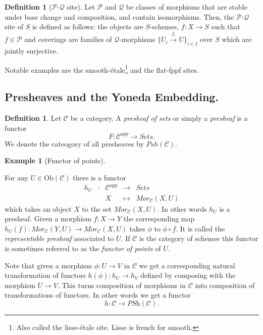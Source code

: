 \documentclass[11pt]{amsart}
\newcommand{\Ob}{\text{Ob}}
\theoremstyle{definition}
\newtheorem{definition}[theorem]{Definition}
\newtheorem{example}[theorem]{Example}
\begin{document}
\begin{definition}[$\mathcal{P}$-$\mathcal{Q}$ site]
	Let $\mathcal{P}$ and $\mathcal{Q}$ be classes of morphisms that are stable under base change and composition, and contain isomorphisms. Then, the $\mathcal{P}$-$\mathcal{Q}$ site of $S$ is defined as follows: the objects are $S$-schemes, $f:X\rightarrow S$ such that $f\in \mathcal{P}$ and coverings are families of $\mathcal{Q}$-morphisms $\{U_i \overset{f_i}{\to} U\}_{i\in I}$ over $S$ which are jointly surjective.
\end{definition}

Notable examples are the smooth-\'{e}tale\footnote{Also called the lisse-\'{e}tale site. Lisse is french for smooth.} and the flat-fppf sites.

\subsection{Presheaves and the Yoneda Embedding.}

\begin{definition}
	Let $\mathcal{C}$ be a category. A \textit{presheaf of sets} or simply a \textit{presheaf} is a functor
	\[F:\mathcal{C}^{opp}\rightarrow \mathit{Sets}.\]
	We denote the cateogory of all presheaves by $\mathit{Psh}(\mathcal{C})$.
\end{definition}

\begin{example}[Functor of points]
	\label{example-hom-functor}

	For any $U\in \Ob(\mathcal{C})$ there is a
	functor
	$$
	\begin{matrix}
	h_U & : & \mathcal{C}^{opp}
	&
	\longrightarrow
	&
	\textit{Sets} \\
	& &
	X
	&
	\longmapsto
	&
	\textit{Mor}_\mathcal{C}(X, U)
	\end{matrix}
	$$
	which takes an object $X$ to the set
	$\textit{Mor}_\mathcal{C}(X, U)$. In other words $h_U$ is a presheaf.
	Given a morphism $f : X\to Y$ the corresponding map
	$h_U(f) :  \textit{Mor}_\mathcal{C}(Y, U)\to \textit{Mor}_\mathcal{C}(X, U)$
	takes $\phi$ to $\phi\circ f$. It is called the {\it representable presheaf} associated to $U$.
	If $\mathcal{C}$ is the category of schemes this functor is
	sometimes referred to as the
	\emph{functor of points} of $U$.
\end{example}

Note that given a morphism $\phi : U \to V$ in $\mathcal{C}$ we get a
corresponding natural transformation of functors $h(\phi) : h_U \to h_V$
defined by composing with the morphism $U \to V$. This turns
composition of morphisms in $\mathcal{C}$ into composition of
transformations of functors. In other words we get a functor
$$
h :
\mathcal{C}
\longrightarrow
\textit{PSh}(\mathcal{C}).
$$
\end{document}
